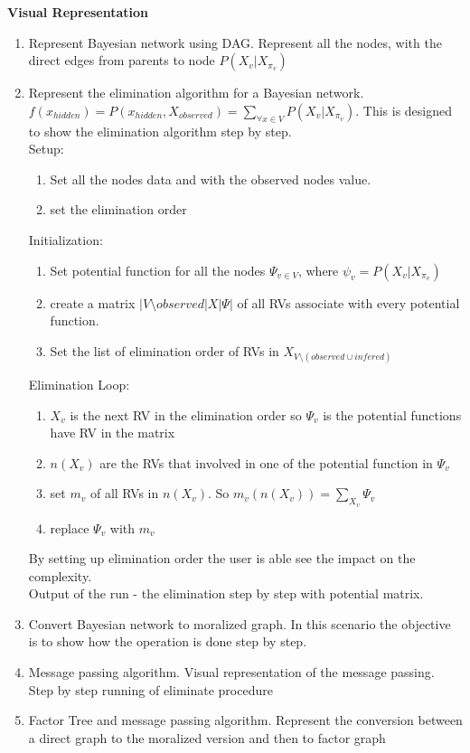 \documentclass{article}
\begin{document}
    \textbf{Visual Representation}\\
    \begin{enumerate}
        \item Represent Bayesian network using DAG. Represent all the nodes, with the direct edges from parents to node $P(X_v | X_{\pi_v})$
        \item Represent the elimination algorithm for a Bayesian network. $f(x_{hidden})=P(x_{hidden},X_{observed})=\sum_{\forall x \in V}P(X_v|X_{\pi_v})$. This is designed to show the elimination algorithm step by step.\\
        Setup:\\
        \begin{enumerate}
            \item Set all the nodes data and with the observed nodes value.
            \item set the elimination order
        \end{enumerate}
        Initialization:\\
        \begin{enumerate}
            \item Set potential function for all the nodes $\Psi_{v \in V}$, where $\psi_v = P(X_v|X_{\pi_v})$
            \item create a matrix $|V\setminus observed| X |\Psi|$ of all RVs associate with every potential function.
            \item Set the list of elimination order of RVs in $X_{V\setminus (observed \cup infered)}$
        \end{enumerate}
        Elimination Loop:\\
        \begin{enumerate}
            \item $X_v$ is the next RV in the elimination order so $\Psi_v$ is the potential functions have RV in the matrix
            \item $n(X_v)$ are the RVs that involved in one of the potential function in $\Psi_v$
            \item set $m_v$ of all RVs in $n(X_v)$. So $m_v(n(X_v))=\sum_{X_v}\Psi_v$
            \item replace $\Psi_v$ with $m_v$
        \end{enumerate}
        By setting up elimination order the user is able see the impact on the complexity.\\
        Output of the run - the elimination step by step with potential matrix.

        \item Convert Bayesian network to moralized graph. In this scenario the objective is to show how the operation is done step by step.

        \item Message passing algorithm. Visual representation of the message passing. Step by step running of eliminate procedure

        \item Factor Tree and message passing algorithm. Represent the conversion between a direct graph to the moralized version and then to factor graph
    \end{enumerate}
\end{document}
